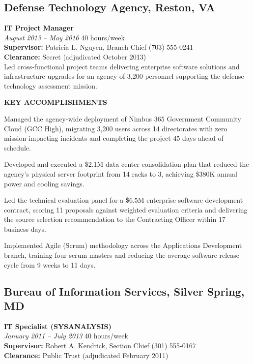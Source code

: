 \documentclass[11pt,letterpaper]{article}
\newcommand{\dutysection}[1]{%
  \par\vspace{6pt}\noindent\textbf{\footnotesize\color{Navy}\MakeUppercase{#1}}\par\vspace{2pt}%
}
\newcommand{\gradebadge}[1]{%
  \tcbox[colback=Gold!15,colframe=Gold!50,arc=3pt,boxrule=0.5pt,
         top=1pt,bottom=1pt,left=5pt,right=5pt,size=small,nobeforeafter]{%
    \footnotesize\color{Gold!90!black}\textbf{GS-#1}}%
}
\begin{document}
\subsection{Defense Technology Agency, Reston, VA}
\noindent\textbf{IT Project Manager} \hfill \gradebadge{12}\\[2pt]
\noindent\small\textit{August 2013 -- May 2016} \hfill \small 40 hours/week\\[2pt]
\noindent\small\textbf{Supervisor:} Patricia L. Nguyen, Branch Chief \hfill (703) 555-0241\\[2pt]
\noindent\small\textbf{Clearance:} Secret (adjudicated October 2013)\\[6pt]

Led cross-functional project teams delivering enterprise software solutions and infrastructure upgrades for an agency of 3,200 personnel supporting the defense technology assessment mission.

\dutysection{Key Accomplishments}
\begin{dutylist}
  \item Managed the agency-wide deployment of Nimbus 365 Government Community Cloud (GCC High), migrating 3,200 users across 14 directorates with zero mission-impacting incidents and completing the project 45 days ahead of schedule.
  \item Developed and executed a \$2.1M data center consolidation plan that reduced the agency's physical server footprint from 14 racks to 3, achieving \$380K annual power and cooling savings.
  \item Led the technical evaluation panel for a \$6.5M enterprise software development contract, scoring 11 proposals against weighted evaluation criteria and delivering the source selection recommendation to the Contracting Officer within 17 business days.
  \item Implemented Agile (Scrum) methodology across the Applications Development branch, training four scrum masters and reducing the average software release cycle from 9 weeks to 11 days.
\end{dutylist}

\subsection{Bureau of Information Services, Silver Spring, MD}
\noindent\textbf{IT Specialist (SYSANALYSIS)} \hfill \gradebadge{11}\\[2pt]
\noindent\small\textit{January 2011 -- July 2013} \hfill \small 40 hours/week\\[2pt]
\noindent\small\textbf{Supervisor:} Robert A. Kendrick, Section Chief \hfill (301) 555-0167\\[2pt]
\noindent\small\textbf{Clearance:} Public Trust (adjudicated February 2011)\\[6pt]
\end{document}
